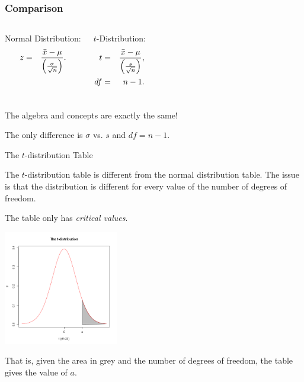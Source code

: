 \begin{frame}
  \frametitle{Comparison}

  \begin{columns}
    Normal Distribution:
    \begin{eqnarray*}
      z &  = & \frac{\bar{x}-\mu}{\left( \frac{\sigma}{\sqrt{n}} \right)}.
    \end{eqnarray*}

    $t$-Distribution:
    \begin{eqnarray*}
      t &  = & \frac{\bar{x}-\mu}{\left( \frac{s}{\sqrt{n}} \right)}, \\
      df & = & n-1.
    \end{eqnarray*}

  \end{columns}

  \vfill

    {

      \begin{center}
        The algebra and concepts are exactly the same!

        The only difference is $\sigma$ vs. $s$ and $df=n-1$.
      \end{center}
    }

    \vfill
  

\end{frame}


\begin{frame}{The $t$-distribution Table}

  The $t$-distribution table is different from the normal distribution
  table. The issue is that the distribution is different for every
  value of the number of degrees of freedom.

  \vfill

  The table only has \textit{critical values}.

  \centerline{\includegraphics[width=5cm]{img/tdistTable}}

  That is, given the area in grey and the number of degrees of
  freedom, the table gives the value of $a$.
  
\end{frame}


